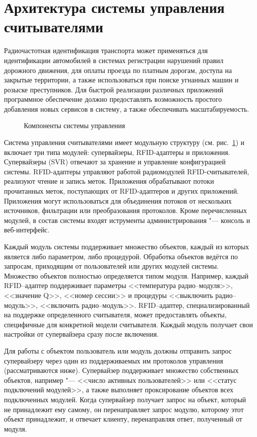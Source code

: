 \section{Архитектура системы управления считывателями}\label{sec:ch5_architecture}
Радиочастотная идентификация транспорта может применяться для идентификации автомобилей в системах регистрации нарушений правил дорожного движения, для оплаты проезда по платным дорогам, доступа на закрытые территории, а также использоваться при поиске угнанных машин и розыске преступников. Для быстрой реализации различных приложений программное обеспечение должно предоставлять возможность простого добавления новых сервисов в систему, а также обеспечивать масштабируемость.

\begin{figure}[ht]
  \caption{Компоненты системы управления}
  \label{fig:ch5_components}
\end{figure}

Система управления считывателями имеет модульную структуру (см. рис.~\ref{fig:ch5_components}) и включает три типа модулей: супервайзеры, RFID-адаптеры и приложения. Супервайзеры (SVR) отвечают за хранение и управление конфигурацией системы. RFID-адаптеры управляют работой радиомодулей RFID-считывателей, реализуют чтение и запись меток. Приложения обрабатывают потоки прочитанных меток, поступающих от RFID-адаптеров и других приложений. Приложения могут использоваться для объединения потоков от нескольких источников, фильтрации или преобразования протоколов. Кроме перечисленных модулей, в состав системы входят иструменты администрирования "--- консоль и веб-интерфейс.

Каждый модуль системы поддерживает множество объектов, каждый из которых является либо параметром, либо процедурой. Обработка объектов ведётся по запросам, приходящим от пользователей или других модулей системы. Множество объектов полностью определяется типом модуля. Например, каждый RFID--адаптер поддерживает параметры <<температура радио--модуля>>, <<значение Q>>, <<номер сессии>> и процедуры <<выключить радио--модуль>>, <<включить радио--модуль>>. RFID--адаптер, специализированный на поддержке определенного считывателя, может предоставлять объекты, специфичные для конкретной модели считывателя. Каждый модуль получает свои настройки от супервайзера сразу после включения.

Для работы с объектом пользователь или модуль должны отправить запрос супервайзеру через один из поддерживаемых им протоколов управления (рассматриваются ниже). Супервайзер поддерживает множество собственных объектов, например "--- <<число активных пользователей>> или <<статус подключений модулей>>, а также выполняет проксирование объектов всех подключенных модулей. Когда супервайзер получает запрос на объект, который не принадлежит ему самому, он перенаправляет запрос модулю, которому этот объект принадлежит, и отвечает клиенту, перенаправляя ответ, полученный от модуля.

